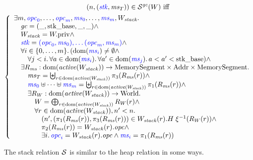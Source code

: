\begin{jversion}
\begin{definition}
  \label{def:stack-rel}
  \begin{multline*}
    \memSatStack{\src{\stk},\ms_T}{W} \text{ iff } \\
    \left\{
        \begin{array}{l}
          \exists m, \src{\opc_0},\dots,\src{\opc_m}, \src{\ms_0}, \dots, \src{\ms_m}, W_\var{stack}\ldotp\\
          \quad\gc = (\_,\stkb,\_,\_) \wedge \\
          \quad W_\var{stack} = \pwpriv \wedge \\
          \quad\src{\stk} = \src{(\opc_0,\ms_0), \dots (\opc_m,\ms_m)} \wedge \\
          \quad\forall i \in \{0,\dots,m\} \ldotp (\dom(\src{\ms_i}) \neq \emptyset \wedge\\
          \quad\quad \forall j < i \ldotp \forall a \in \dom(\src{\ms_i}) \ldotp \forall a' \in \dom(\src{\ms_j}) \ldotp a < a' < \stkb) \wedge\\
          \quad\exists R_\ms : \dom(\activeReg{W_\var{stack}}) \fun \MemSeg \times \Addr \times \MemSeg \ldotp \\
          \quad\quad \ms_T = \biguplus_{r \in \dom(\activeReg{W_\var{stack}})} \pi_3(R_\ms(r)) \wedge \\
          \quad\quad \src{\ms_0} \uplus \dots \uplus \src{\ms_m} = \biguplus_{r \in \dom(\activeReg{W_\var{stack}})} \pi_1(R_\ms(r)) \wedge \\
          \quad\quad \exists R_W : \dom(\activeReg{W_\var{stack}}) \fun \World \ldotp \\
          \quad\qquad W = \bigoplus_{r \in \dom(\activeReg{W_\var{stack}})} R_W(r) \wedge \\
          \quad\qquad \forall r \in \dom(\activeReg{W_\var{stack}}), n' < n\ldotp \\
          \quad\qquad \quad \npair[n']{(\pi_1(R_\ms(r)),\pi_3(R_\ms(r))} \in W_\var{stack}(r).H \; \xi^{-1}(R_W(r)) \wedge\\
          \quad\qquad \quad \pi_2(R_\ms(r)) = W_\var{stack}(r).\opc \wedge\\
          \quad\qquad \quad \exists i \ldotp \src{\opc_i} = W_\var{stack}(r).\opc \wedge \src{\ms_i} = \pi_1 (R_\ms(r))
        \end{array}
      \right.
  \end{multline*}
\end{definition}
The stack relation $\lrstk[]$ is similar to the heap relation in some ways.

\end{jversion}
